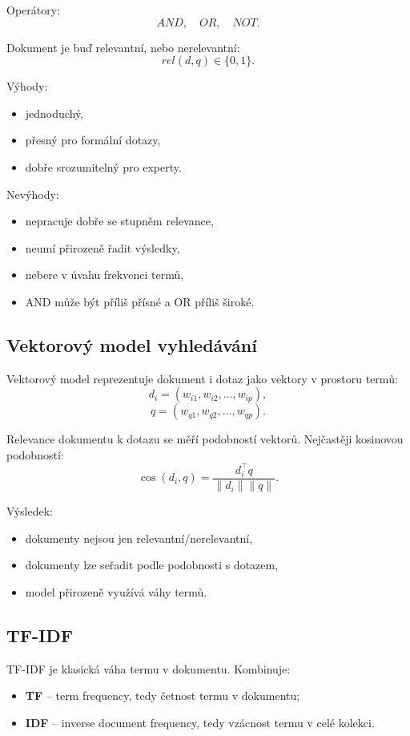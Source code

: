 Operátory:
\[
AND,\quad OR,\quad NOT.
\]

Dokument je buď relevantní, nebo nerelevantní:
\[
rel(d,q)\in\{0,1\}.
\]

Výhody:
\begin{itemize}
    \item jednoduchý,
    \item přesný pro formální dotazy,
    \item dobře srozumitelný pro experty.
\end{itemize}

Nevýhody:
\begin{itemize}
    \item nepracuje dobře se stupněm relevance,
    \item neumí přirozeně řadit výsledky,
    \item nebere v úvahu frekvenci termů,
    \item AND může být příliš přísné a OR příliš široké.
\end{itemize}

\subsection{Vektorový model vyhledávání}

Vektorový model reprezentuje dokument i dotaz jako vektory v prostoru termů:
\[
d_i=(w_{i1},w_{i2},\ldots,w_{ip}),
\]
\[
q=(w_{q1},w_{q2},\ldots,w_{qp}).
\]

Relevance dokumentu k dotazu se měří podobností vektorů. Nejčastěji kosinovou podobností:
\[
\cos(d_i,q)
=
\frac{d_i^\top q}
{\|d_i\|\|q\|}.
\]

Výsledek:
\begin{itemize}
    \item dokumenty nejsou jen relevantní/nerelevantní,
    \item dokumenty lze seřadit podle podobnosti s dotazem,
    \item model přirozeně využívá váhy termů.
\end{itemize}

\subsection{TF-IDF}

TF-IDF je klasická váha termu v dokumentu. Kombinuje:
\begin{itemize}
    \item \textbf{TF} -- term frequency, tedy četnost termu v dokumentu;
    \item \textbf{IDF} -- inverse document frequency, tedy vzácnost termu v celé kolekci.
\end{itemize}

